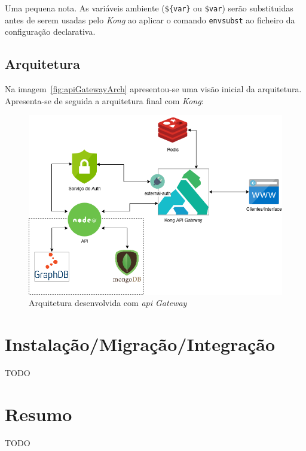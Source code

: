 Uma pequena nota. As variáveis ambiente (\verb|${var}| ou \verb|$var|) serão substituidas antes de serem usadas pelo \textit{Kong} ao aplicar o comando \texttt{envsubst} ao ficheiro da configuração declarativa.

\subsection{Arquitetura}
Na imagem~\ref{fig:apiGatewayArch} apresentou-se uma visão inicial da arquitetura. Apresenta-se de seguida a arquitetura final com \textit{Kong}: 
\begin{figure}[H]
    \begin{center}
        \includegraphics[width=1\textwidth]{img/apiGatewayArchFinal.png}
    \end{center}
    \caption{Arquitetura desenvolvida com \textit{\acrshort{api} Gateway}}\label{fig:apiGatewayArchFinal}
\end{figure}

\section{Instalação/Migração/Integração}
TODO

\section{Resumo}
TODO
